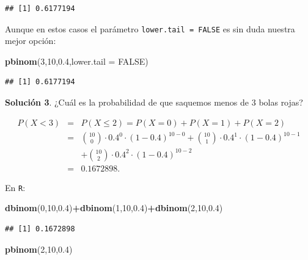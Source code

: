 \documentclass[]{book}
\newenvironment{Shaded}{\begin{snugshade}}{\end{snugshade}}
\newcommand{\DataTypeTok}[1]{\textcolor[rgb]{0.13,0.29,0.53}{#1}}
\newcommand{\DecValTok}[1]{\textcolor[rgb]{0.00,0.00,0.81}{#1}}
\newcommand{\FloatTok}[1]{\textcolor[rgb]{0.00,0.00,0.81}{#1}}
\newcommand{\KeywordTok}[1]{\textcolor[rgb]{0.13,0.29,0.53}{\textbf{#1}}}
\newcommand{\NormalTok}[1]{#1}
\newcommand{\OperatorTok}[1]{\textcolor[rgb]{0.81,0.36,0.00}{\textbf{#1}}}
\newcommand{\OtherTok}[1]{\textcolor[rgb]{0.56,0.35,0.01}{#1}}
\begin{document}
\begin{verbatim}
## [1] 0.6177194
\end{verbatim}

Aunque en estos casos el parámetro \texttt{lower.tail\ =\ FALSE} es sin duda nuestra mejor opción:

\begin{Shaded}
\begin{Highlighting}[]
\KeywordTok{pbinom}\NormalTok{(}\DecValTok{3}\NormalTok{,}\DecValTok{10}\NormalTok{,}\FloatTok{0.4}\NormalTok{,}\DataTypeTok{lower.tail =} \OtherTok{FALSE}\NormalTok{)}
\end{Highlighting}
\end{Shaded}

\begin{verbatim}
## [1] 0.6177194
\end{verbatim}

\textbf{Solución 3}. ¿Cuál es la probabilidad de que saquemos menos de \(3\) bolas rojas?

\begin{eqnarray*}
P(X< 3)&=& P(X\leq 2)=  P(X=0)+P(X=1)+P(X=2)\\
&=& 
{10\choose 0}\cdot 0.4^0\cdot (1-0.4)^{10-0}+ {10\choose 1}\cdot 0.4^1\cdot (1-0.4)^{10-1}\\
&&+
{10\choose 2}\cdot 0.4^2\cdot (1-0.4)^{10-2}\\
&=&0.1672898.
\end{eqnarray*}

En \texttt{R}:

\begin{Shaded}
\begin{Highlighting}[]
\KeywordTok{dbinom}\NormalTok{(}\DecValTok{0}\NormalTok{,}\DecValTok{10}\NormalTok{,}\FloatTok{0.4}\NormalTok{)}\OperatorTok{+}\KeywordTok{dbinom}\NormalTok{(}\DecValTok{1}\NormalTok{,}\DecValTok{10}\NormalTok{,}\FloatTok{0.4}\NormalTok{)}\OperatorTok{+}\KeywordTok{dbinom}\NormalTok{(}\DecValTok{2}\NormalTok{,}\DecValTok{10}\NormalTok{,}\FloatTok{0.4}\NormalTok{)}
\end{Highlighting}
\end{Shaded}

\begin{verbatim}
## [1] 0.1672898
\end{verbatim}

\begin{Shaded}
\begin{Highlighting}[]
\KeywordTok{pbinom}\NormalTok{(}\DecValTok{2}\NormalTok{,}\DecValTok{10}\NormalTok{,}\FloatTok{0.4}\NormalTok{)}
\end{Highlighting}
\end{Shaded}
\end{document}
